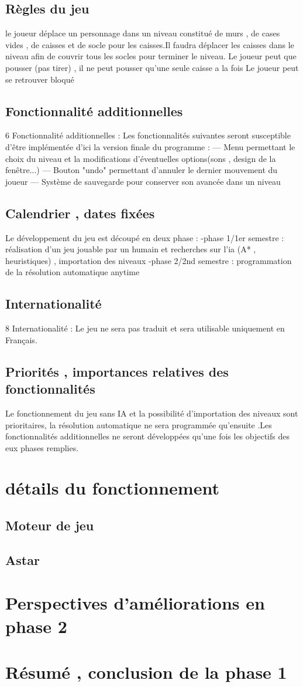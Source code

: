 \documentclass{article}
\begin{document}
		\subsection{Règles du jeu}
		le joueur déplace un personnage dans un niveau constitué de murs , de cases
vides , de caisses et de socle pour les caisses.Il faudra déplacer les caisses dans
le niveau afin de couvrir tous les socles pour terminer le niveau. Le joueur peut
que pousser (pas tirer) , il ne peut pousser qu’une seule caisse a la fois Le joueur
peut se retrouver bloqué
		\subsection{Fonctionnalité additionnelles}
			6 Fonctionnalité additionnelles :
Les fonctionnalités suivantes seront susceptible d’être implémentée d’ici la
version finale du programme :
— Menu permettant le choix du niveau et la modifications d’éventuelles
options(sons , design de la fenêtre...)
— Bouton "undo" permettant d’annuler le dernier mouvement du joueur
— Système de sauvegarde pour conserver son avancée dans un niveau
		\subsection{Calendrier , dates fixées}
		Le développement du jeu est découpé en deux phase :
-phase 1/1er semestre : réalisation d’un jeu jouable par un humain et recherches
sur l’ia (A* , heuristiques) , importation des niveaux
-phase 2/2nd semestre : programmation de la résolution automatique anytime
		\subsection{Internationalité}
		8 Internationalité :
Le jeu ne sera pas traduit et sera utilisable uniquement en Français.
		\subsection{Priorités , importances relatives des fonctionnalités}
		Le fonctionnement du jeu sans IA et la possibilité d’importation des niveaux
sont prioritaires, la résolution automatique ne sera programmée qu’ensuite .Les
fonctionnalités additionnelles ne seront développées qu’une fois les objectifs des
eux phases remplies.
	\section{détails du fonctionnement}
		\subsection{Moteur de jeu}
		\subsection{Astar}
	\section{Perspectives d'améliorations en phase 2}
	\section{Résumé , conclusion de la phase 1}
	


		

\newpage
\end{document}
